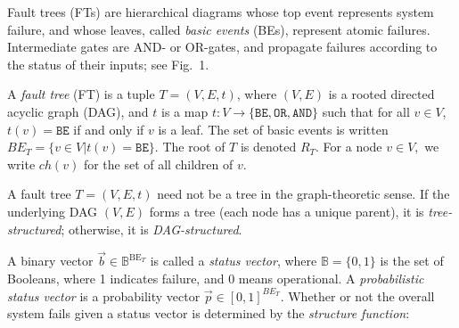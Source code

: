 \documentclass[runningheads]{llncs}
\newcommand{\myparagraph}[1]{\medskip\noindent{\bf #1}}
\newcommand{\MS}[1]{{\color{blue}\textbf{Mariëlle:} #1}}
\newcommand{\basicevents}{\mathit{BE}}
\renewcommand{\emph}[1]{{\it #1}}
\begin{document}
Fault trees (FTs) are hierarchical diagrams whose top event represents system failure, and whose leaves, called \emph{basic events} (BEs), represent atomic failures. 
Intermediate gates are AND- or OR-gates, and propagate failures according to the status of their inputs; see Fig.~1.



\begin{definition}\label{def:FTs}
    A \emph{fault tree} (FT) is a tuple $T=(V,E,t)$, where $(V,E)$ is a rooted directed acyclic graph (DAG), and $t$ is a map $t\colon V \rightarrow \{\mathtt{BE}, \mathtt{OR}, \mathtt{AND}\}$ such that for all $v \in V$, $t(v) = \mathtt{BE}$ if and only if $v$ is a leaf. 
    The set of basic events is written $\basicevents_T = \{ v\in V | t(v) = \mathtt{BE}\}$. 
    The root of $T$ is denoted $R_T$. For a node $v \in V,$ we write $ch(v)$ for the set of all children of $v$.
\end{definition}
A fault tree $T = (V, E, t)$ need not be a tree in the graph-theoretic sense. If the underlying DAG $(V, E)$ forms a tree (each node has a unique parent), it is \emph{tree-structured}; otherwise, it is \emph{DAG-structured}.


A binary vector $\vec{b} \in \mathbb{B}^{\text{BE}_T}$ is called a \emph{status vector}, where $\mathbb{B}=\{0,1\}$ is the set of Booleans, where 1 indicates failure, and 0 means operational. 
A \emph{probabilistic status vector} is a probability vector $\vec{p} \in [0,1]^{\basicevents_T}$.
Whether or not the overall system fails given a status vector is determined by the \emph{structure function}: 
\end{document}
